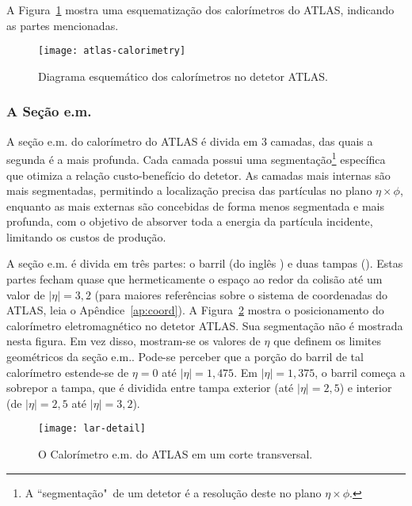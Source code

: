 A Figura~\ref{fig:calo-general} mostra uma esquematização dos calorímetros do
ATLAS, indicando as partes mencionadas.

\begin{figure}
\begin{center}
\texttt{[image: atlas-calorimetry]}
\end{center}
\caption{Diagrama esquemático dos calorímetros no detetor ATLAS.}
\label{fig:calo-general}
\end{figure}

\subsubsection{A Seção e.m.}

A seção e.m. do calorímetro do ATLAS é divida em 3 camadas, das quais a
segunda é a mais profunda. Cada camada possui uma segmentação\footnote{A
``segmentação"\ de um detetor é a resolução deste no plano $\eta\times\phi$.} 
específica que otimiza a relação custo-benefício do detetor. As camadas mais
internas são mais segmentadas, permitindo a localização precisa das partículas
no plano $\eta\times\phi$, enquanto as mais externas são concebidas de forma
menos segmentada e mais profunda, com o objetivo de absorver toda a energia da
partícula incidente, limitando os custos de produção.

A seção e.m. é divida em três partes: o barril (do inglês
) e duas tampas (). Estas partes fecham quase que
hermeticamente o espaço ao redor da colisão até um valor de $|\eta|=3,2$ (para
maiores referências sobre o sistema de coordenadas do ATLAS, leia o
Apêndice~\ref{ap:coord}). A Figura~\ref{fig:lar-pos} mostra o posicionamento
do calorímetro eletromagnético no detetor ATLAS. Sua segmentação não é
mostrada nesta figura. Em vez disso, mostram-se os valores de $\eta$ que
definem os limites geométricos da seção e.m.. Pode-se perceber que a porção do
barril de tal calorímetro estende-se de $\eta=0$ até $|\eta|=1,475$. Em
$|\eta|=1,375$, o barril começa a sobrepor a tampa, que é dividida entre tampa
exterior (até $|\eta|=2,5$) e interior (de $|\eta|=2,5$ até $|\eta|=3,2$).

\begin{figure}
\begin{center}
\texttt{[image: lar-detail]}
\end{center}
\caption{O Calorímetro e.m. do ATLAS em um corte transversal.}
\label{fig:lar-pos}
\end{figure}

